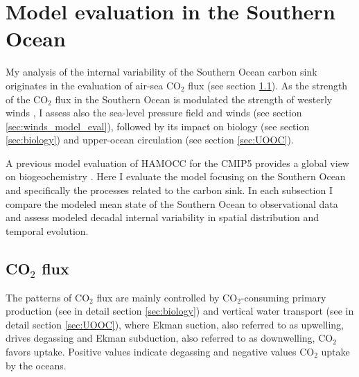 \chapter{Model evaluation in the Southern Ocean} %

\label{ch:eval}


My analysis of the internal variability of the Southern Ocean carbon sink originates in the evaluation of air-sea CO$_2$ flux (see section  \ref{sec:co2flux_model_eval}). As the strength of the CO$_2$ flux in the Southern Ocean is modulated the strength of westerly winds \citep{Lovenduski2007}, I assess also the sea-level pressure field and  winds (see section \ref{sec:winds_model_eval}), followed by its impact on biology (see section \ref{sec:biology}) and upper-ocean circulation (see section \ref{sec:UOOC}).

A previous model evaluation of \acs{HAMOCC} for the \ac{CMIP5} provides a global view on biogeochemistry \citep{Ilyina2013}. Here I evaluate the model focusing on the Southern Ocean and specifically the processes related to the carbon sink. In each subsection I compare the modeled mean state of the Southern Ocean to observational data and assess modeled decadal internal variability in spatial distribution and temporal evolution. 


 

\section{CO$_2$ flux}
\label{sec:co2flux_model_eval}

The patterns of CO$_2$ flux are mainly controlled by CO$_2$-consuming primary production (see in detail section \ref{sec:biology}) and vertical water transport (see in detail section \ref{sec:UOOC}), where Ekman suction, also referred to as upwelling, drives degassing and Ekman subduction, also referred to as downwelling, CO$_2$ favors uptake. Positive values indicate degassing and negative values CO$_2$ uptake by the oceans.\newline %

